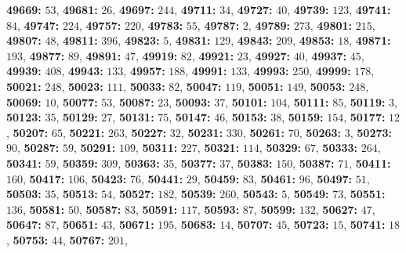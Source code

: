 \textsf{\bfseries 49669:} $53$, \textsf{\bfseries 49681:} $26$, \textsf{\bfseries 49697:} $244$, \textsf{\bfseries 49711:} $34$, \textsf{\bfseries 49727:} $40$, \textsf{\bfseries 49739:} $123$, \textsf{\bfseries 49741:} $84$, \textsf{\bfseries 49747:} $224$, \textsf{\bfseries 49757:} $220$, \textsf{\bfseries 49783:} $55$, \textsf{\bfseries 49787:} $2$, \textsf{\bfseries 49789:} $273$, \textsf{\bfseries 49801:} $215$, \textsf{\bfseries 49807:} $48$, \textsf{\bfseries 49811:} $396$, \textsf{\bfseries 49823:} $5$, \textsf{\bfseries 49831:} $129$, \textsf{\bfseries 49843:} $209$, \textsf{\bfseries 49853:} $18$, \textsf{\bfseries 49871:} $193$, \textsf{\bfseries 49877:} $89$, \textsf{\bfseries 49891:} $47$, \textsf{\bfseries 49919:} $82$, \textsf{\bfseries 49921:} $23$, \textsf{\bfseries 49927:} $40$, \textsf{\bfseries 49937:} $45$, \textsf{\bfseries 49939:} $408$, \textsf{\bfseries 49943:} $133$, \textsf{\bfseries 49957:} $188$, \textsf{\bfseries 49991:} $133$, \textsf{\bfseries 49993:} $250$, \textsf{\bfseries 49999:} $178$, \textsf{\bfseries 50021:} $248$, \textsf{\bfseries 50023:} $111$, \textsf{\bfseries 50033:} $82$, \textsf{\bfseries 50047:} $119$, \textsf{\bfseries 50051:} $149$, \textsf{\bfseries 50053:} $248$, \textsf{\bfseries 50069:} $10$, \textsf{\bfseries 50077:} $53$, \textsf{\bfseries 50087:} $23$, \textsf{\bfseries 50093:} $37$, \textsf{\bfseries 50101:} $104$, \textsf{\bfseries 50111:} $85$, \textsf{\bfseries 50119:} $3$, \textsf{\bfseries 50123:} $35$, \textsf{\bfseries 50129:} $27$, \textsf{\bfseries 50131:} $75$, \textsf{\bfseries 50147:} $46$, \textsf{\bfseries 50153:} $38$, \textsf{\bfseries 50159:} $154$, \textsf{\bfseries 50177:} $12$, \textsf{\bfseries 50207:} $65$, \textsf{\bfseries 50221:} $263$, \textsf{\bfseries 50227:} $32$, \textsf{\bfseries 50231:} $330$, \textsf{\bfseries 50261:} $70$, \textsf{\bfseries 50263:} $3$, \textsf{\bfseries 50273:} $90$, \textsf{\bfseries 50287:} $59$, \textsf{\bfseries 50291:} $109$, \textsf{\bfseries 50311:} $227$, \textsf{\bfseries 50321:} $114$, \textsf{\bfseries 50329:} $67$, \textsf{\bfseries 50333:} $264$, \textsf{\bfseries 50341:} $59$, \textsf{\bfseries 50359:} $309$, \textsf{\bfseries 50363:} $35$, \textsf{\bfseries 50377:} $37$, \textsf{\bfseries 50383:} $150$, \textsf{\bfseries 50387:} $71$, \textsf{\bfseries 50411:} $160$, \textsf{\bfseries 50417:} $106$, \textsf{\bfseries 50423:} $76$, \textsf{\bfseries 50441:} $29$, \textsf{\bfseries 50459:} $83$, \textsf{\bfseries 50461:} $96$, \textsf{\bfseries 50497:} $51$, \textsf{\bfseries 50503:} $35$, \textsf{\bfseries 50513:} $54$, \textsf{\bfseries 50527:} $182$, \textsf{\bfseries 50539:} $260$, \textsf{\bfseries 50543:} $5$, \textsf{\bfseries 50549:} $73$, \textsf{\bfseries 50551:} $136$, \textsf{\bfseries 50581:} $50$, \textsf{\bfseries 50587:} $83$, \textsf{\bfseries 50591:} $117$, \textsf{\bfseries 50593:} $87$, \textsf{\bfseries 50599:} $132$, \textsf{\bfseries 50627:} $47$, \textsf{\bfseries 50647:} $87$, \textsf{\bfseries 50651:} $43$, \textsf{\bfseries 50671:} $195$, \textsf{\bfseries 50683:} $14$, \textsf{\bfseries 50707:} $45$, \textsf{\bfseries 50723:} $15$, \textsf{\bfseries 50741:} $18$, \textsf{\bfseries 50753:} $44$, \textsf{\bfseries 50767:} $201$, 
